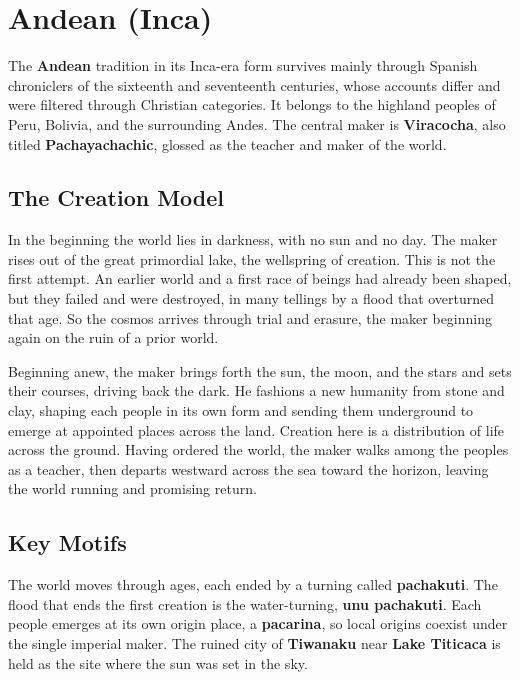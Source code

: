 \section{Andean (Inca)}

The \textbf{Andean} tradition in its Inca-era form survives mainly through Spanish chroniclers of the sixteenth and seventeenth centuries, whose accounts differ and were filtered through Christian categories. It belongs to the highland peoples of Peru, Bolivia, and the surrounding Andes. The central maker is \textbf{Viracocha}, also titled \textbf{Pachayachachic}, glossed as the teacher and maker of the world.

\subsection{The Creation Model}

In the beginning the world lies in darkness, with no sun and no day. The maker rises out of the great primordial lake, the wellspring of creation. This is not the first attempt. An earlier world and a first race of beings had already been shaped, but they failed and were destroyed, in many tellings by a flood that overturned that age. So the cosmos arrives through trial and erasure, the maker beginning again on the ruin of a prior world.

Beginning anew, the maker brings forth the sun, the moon, and the stars and sets their courses, driving back the dark. He fashions a new humanity from stone and clay, shaping each people in its own form and sending them underground to emerge at appointed places across the land. Creation here is a distribution of life across the ground. Having ordered the world, the maker walks among the peoples as a teacher, then departs westward across the sea toward the horizon, leaving the world running and promising return.

\subsection{Key Motifs}

The world moves through ages, each ended by a turning called \textbf{pachakuti}. The flood that ends the first creation is the water-turning, \textbf{unu pachakuti}. Each people emerges at its own origin place, a \textbf{pacarina}, so local origins coexist under the single imperial maker. The ruined city of \textbf{Tiwanaku} near \textbf{Lake Titicaca} is held as the site where the sun was set in the sky.

